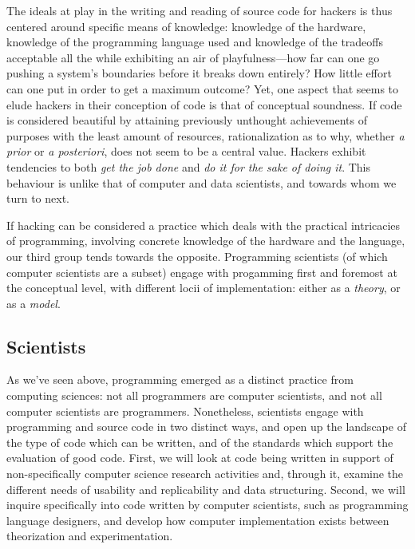The ideals at play in the writing and reading of source code for hackers is thus centered around specific means of knowledge: knowledge of the hardware, knowledge of the programming language used and knowledge of the tradeoffs acceptable all the while exhibiting an air of playfulness—how far can one go pushing a system's boundaries before it breaks down entirely? How little effort can one put in order to get a maximum outcome? Yet, one aspect that seems to elude hackers in their conception of code is that of conceptual soundness. If code is considered beautiful by attaining previously unthought achievements of purposes with the least amount of resources, rationalization as to why, whether \emph{a prior} or \emph{a posteriori}, does not seem to be a central value. Hackers exhibit tendencies to both \emph{get the job done} and \emph{do it for the sake of doing it}. This behaviour is unlike that of computer and data scientists, and towards whom we turn to next.

\vspace*{2\baselineskip}

If hacking can be considered a practice which deals with the practical intricacies of programming, involving concrete knowledge of the hardware and the language, our third group tends towards the opposite. Programming scientists (of which computer scientists are a subset) engage with progamming first and foremost at the conceptual level, with different locii of implementation: either as a \emph{theory}, or as a \emph{model}.

\subsection{Scientists}

As we've seen above, programming emerged as a distinct practice from computing sciences: not all programmers are computer scientists, and not all computer scientists are programmers. Nonetheless, scientists engage with programming and source code in two distinct ways, and open up the landscape of the type of code which can be written, and of the standards which support the evaluation of good code. First, we will look at code being written in support of non-specifically computer science research activities and, through it, examine the different needs of usability and replicability and data structuring. Second, we will inquire specifically into code written by computer scientists, such as programming language designers, and develop how computer implementation exists between theorization and experimentation\cite{vardi_science_2010}.

